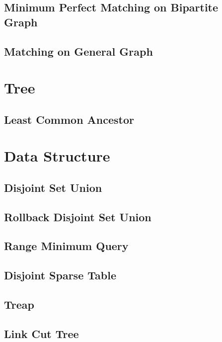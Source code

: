 \documentclass{article}
\begin{document}
\begin{multicols}{2}
    \subsection{Minimum Perfect Matching on Bipartite Graph}
    
    \subsection{Matching on General Graph}
    

    \section{Tree}
    \subsection{Least Common Ancestor}
    

    \section{Data Structure}
    \subsection{Disjoint Set Union}
    
    \subsection{Rollback Disjoint Set Union}
    
    \subsection{Range Minimum Query}
    
    \subsection{Disjoint Sparse Table}
    
    \subsection{Treap}
    
    \subsection{Link Cut Tree}
    


\end{multicols}
\end{document}
